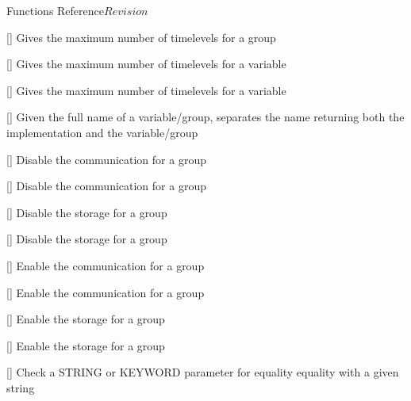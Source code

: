 \begin{cactuspart}{ Functions Reference}{}{$Revision$}
\begin{Lentry}
\item[\code{CCTK\_DeclaredTimelevelsGN}] [\pageref{CCTK-DeclaredTimelevelsGN}]
  Gives the maximum number of timelevels for a group

\item[\code{CCTK\_DeclaredTimelevelsVI}] [\pageref{CCTK-DeclaredTimelevelsVI}]
  Gives the maximum number of timelevels for a variable

\item[\code{CCTK\_DeclaredTimelevelsVN}] [\pageref{CCTK-DeclaredTimelevelsVN}]
  Gives the maximum number of timelevels for a variable

\item[\code{CCTK\_DecomposeName}] [\pageref{CCTK-DecomposeName}]
  Given the full name of a variable/group, separates the name
  returning both the implementation and the variable/group

\item[\code{CCTK\_DisableGroupComm}] [\pageref{CCTK-DisableGroupComm}]
  Disable the communication for a group

\item[\code{CCTK\_DisableGroupCommI}] [\pageref{CCTK-DisableGroupCommI}]
  Disable the communication for a group

\item[\code{CCTK\_DisableGroupStorage}] [\pageref{CCTK-DisableGroupStorage}]
  Disable the storage for a group

\item[\code{CCTK\_DisableGroupStorageI}] [\pageref{CCTK-DisableGroupStorageI}]
  Disable the storage for a group

\item[\code{CCTK\_EnableGroupComm}] [\pageref{CCTK-EnableGroupComm}]
  Enable the communication for a group

\item[\code{CCTK\_EnableGroupCommI}] [\pageref{CCTK-EnableGroupCommI}]
  Enable the communication for a group

\item[\code{CCTK\_EnableGroupStorage}] [\pageref{CCTK-EnableGroupStorage}]
  Enable the storage for a group

\item[\code{CCTK\_EnableGroupStorageI}] [\pageref{CCTK-EnableGroupStorageI}]
  Enable the storage for a group

\item[\code{CCTK\_Equals}] [\pageref{CCTK-Equals}]
  Check a STRING or KEYWORD parameter for equality equality
  with a given string


\end{Lentry}
\end{cactuspart}
